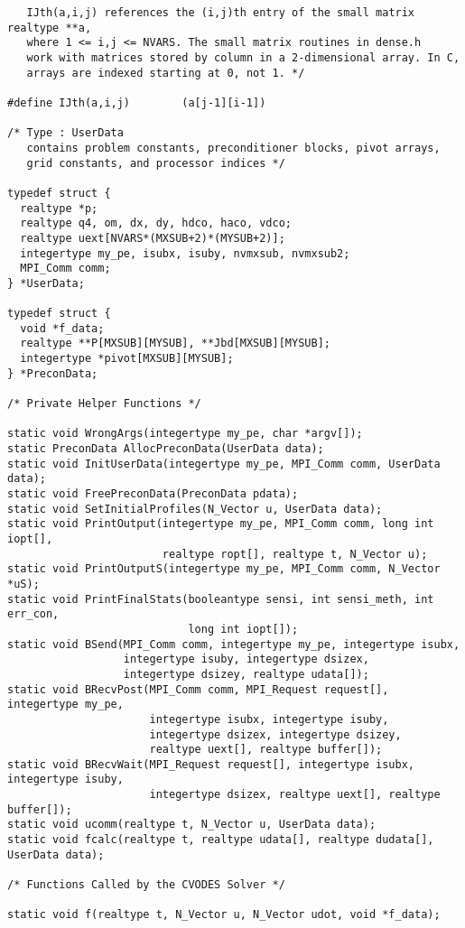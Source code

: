 \begin{verbatim}
   IJth(a,i,j) references the (i,j)th entry of the small matrix realtype **a,
   where 1 <= i,j <= NVARS. The small matrix routines in dense.h
   work with matrices stored by column in a 2-dimensional array. In C,
   arrays are indexed starting at 0, not 1. */

#define IJth(a,i,j)        (a[j-1][i-1])

/* Type : UserData 
   contains problem constants, preconditioner blocks, pivot arrays, 
   grid constants, and processor indices */

typedef struct {
  realtype *p;
  realtype q4, om, dx, dy, hdco, haco, vdco;
  realtype uext[NVARS*(MXSUB+2)*(MYSUB+2)];
  integertype my_pe, isubx, isuby, nvmxsub, nvmxsub2;
  MPI_Comm comm;
} *UserData;

typedef struct {
  void *f_data;
  realtype **P[MXSUB][MYSUB], **Jbd[MXSUB][MYSUB];
  integertype *pivot[MXSUB][MYSUB];
} *PreconData;

/* Private Helper Functions */

static void WrongArgs(integertype my_pe, char *argv[]);
static PreconData AllocPreconData(UserData data);
static void InitUserData(integertype my_pe, MPI_Comm comm, UserData data);
static void FreePreconData(PreconData pdata);
static void SetInitialProfiles(N_Vector u, UserData data);
static void PrintOutput(integertype my_pe, MPI_Comm comm, long int iopt[],
                        realtype ropt[], realtype t, N_Vector u);
static void PrintOutputS(integertype my_pe, MPI_Comm comm, N_Vector *uS);
static void PrintFinalStats(booleantype sensi, int sensi_meth, int err_con, 
                            long int iopt[]);
static void BSend(MPI_Comm comm, integertype my_pe, integertype isubx, 
                  integertype isuby, integertype dsizex, 
                  integertype dsizey, realtype udata[]);
static void BRecvPost(MPI_Comm comm, MPI_Request request[], integertype my_pe,
                      integertype isubx, integertype isuby,
                      integertype dsizex, integertype dsizey,
                      realtype uext[], realtype buffer[]);
static void BRecvWait(MPI_Request request[], integertype isubx, integertype isuby,
                      integertype dsizex, realtype uext[], realtype buffer[]);
static void ucomm(realtype t, N_Vector u, UserData data);
static void fcalc(realtype t, realtype udata[], realtype dudata[], UserData data);

/* Functions Called by the CVODES Solver */

static void f(realtype t, N_Vector u, N_Vector udot, void *f_data);


\end{verbatim}

